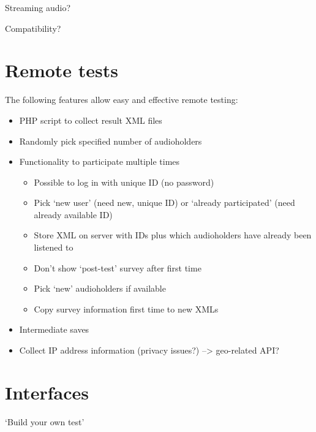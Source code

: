 \documentclass{sig-alternate}
\begin{document}
	
	Streaming audio? %

	Compatibility? 
	
	
\section{Remote tests} %
	The following features allow easy and effective remote testing: 
	\begin{itemize}
		\item PHP script to collect result XML files
		\item Randomly pick specified number of audioholders
		\item Functionality to participate multiple times
			\begin{itemize}
				\item Possible to log in with unique ID (no password)
				\item Pick `new user' (need new, unique ID) or `already participated' (need already available ID)
				\item Store XML on server with IDs plus which audioholders have already been listened to
				\item Don't show `post-test' survey after first time
				\item Pick `new' audioholders if available
				\item Copy survey information first time to new XMLs
			\end{itemize}
		\item Intermediate saves
		\item Collect IP address information (privacy issues?) --> geo-related API? 
	\end{itemize}

	
\section{Interfaces} %
	`Build your own test'
\end{document}
